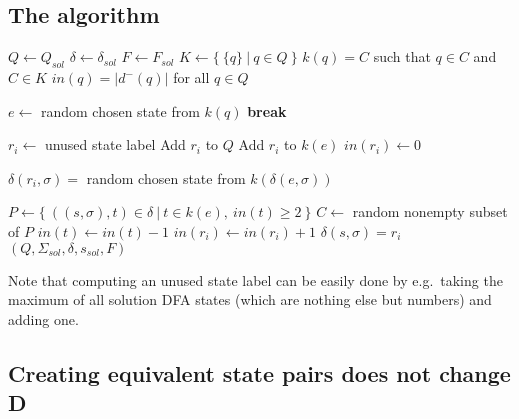 \subsection{The algorithm}

\vspace{0.2cm}
\begin{spacing}{1}
\begin{algorithmic}[1]
    \State $Q \gets Q_{sol}$
    \State $\delta \gets \delta_{sol}$
    \State $F \gets F_{sol}$
	\State $K \gets \{\ \{q\}\ |\ q \in Q\ \}$ 
	\State $k(q) = C$ such that $q \in C$ and $C \in K$ 
	\State $in(q) = |d^-(q)|$ for all $q \in Q$ 
	
		 
				\State $e \gets$ random chosen state from $k(q)$
				\State \textbf{break}
			\EndIf
		\EndFor
		
		\State $r_i \gets$ unused state label 
        \State Add $r_i$ to $Q$
		\State Add $r_i$ to $k(e)$
		\State $in(r_i) \gets 0$
		
		 
			\State $\delta(r_i, \sigma) =$ random chosen state from $k(\delta(e, \sigma))$
		\EndFor
		
		\State $P \gets \{\ ((s, \sigma), t) \in \delta\ |\ t \in k(e),\ in(t) \geq 2\ \}$ 
		\State $C \gets$ random nonempty subset of $P$
			\State $in(t) \gets in(t) - 1$
			\State $in(r_i) \gets in(r_i) + 1$
            \State $\delta(s, \sigma) = r_i$
		\EndFor
	\EndFor
    \State \Return $(Q, \Sigma_{sol}, \delta, s_{sol}, F)$
	\EndFunction
\end{algorithmic}
\end{spacing}
\vspace{0.2cm}
\noindent Note that computing an unused state label can be easily done by e.g.\ taking the maximum of all solution DFA states (which are nothing else but numbers) and adding one.

\subsection{Creating equivalent state pairs does not change D} \label{ch:4:sec-D-proof}

